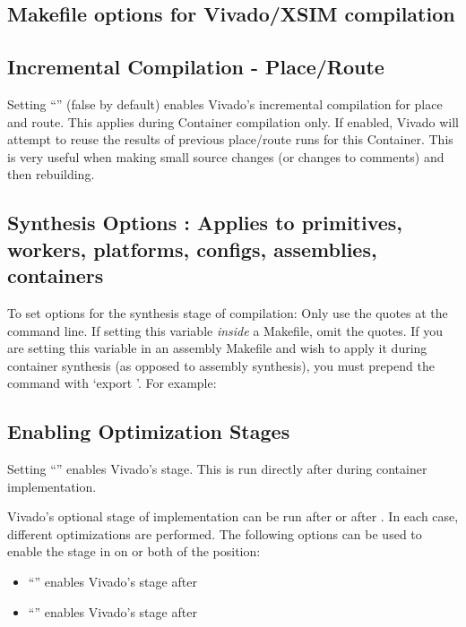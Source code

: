 \begin{flushleft}
\section{Makefile options for Vivado/XSIM compilation}
\subsection{Incremental Compilation - Place/Route}
Setting ``'' (false by default) enables Vivado's incremental compilation for place and route. This applies during Container compilation only. If enabled, Vivado will attempt to reuse the results of previous place/route runs for this Container. This is very useful when making small source changes (or changes to comments) and then rebuilding.

\subsection{Synthesis Options : Applies to primitives, workers, platforms, configs, assemblies, containers}
\label{synth-opt}
To set options for the synthesis stage of compilation:\newline
{}\newline
Only use the quotes at the command line. If setting this variable \textit{inside} a Makefile, omit the quotes. If you are setting this variable in an assembly Makefile and wish to apply it during container synthesis (as opposed to assembly synthesis), you must prepend the command with `export '. For example:\newline
{}\newline

\subsection{Enabling Optimization Stages}
Setting ``'' enables Vivado's  stage. This is run directly after  during container implementation.\newline

Vivado's optional  stage of implementation can be run after  or after . In each case, different optimizations are performed. The following options can be used to enable the  stage in on or both of the position:\newline
\begin{itemize}
\item ``'' enables Vivado's  stage after 
\item ``'' enables Vivado's  stage after 
\end{itemize}


\end{flushleft}
